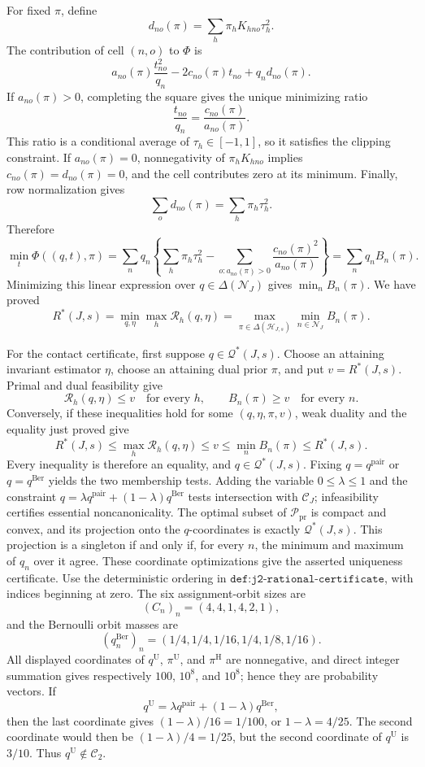 For fixed \(\pi\), define
\[
 d_{no}(\pi)=\sum_h\pi_hK_{hno}\tau_h^2.
\]
The contribution of cell \((n,o)\) to \(\Phi\) is
\[
 a_{no}(\pi)\frac{t_{no}^2}{q_n}-2c_{no}(\pi)t_{no}+q_nd_{no}(\pi).
\]
If \(a_{no}(\pi)>0\), completing the square gives the unique minimizing ratio
\[
 \frac{t_{no}}{q_n}=\frac{c_{no}(\pi)}{a_{no}(\pi)}.
\]
This ratio is a conditional average of \(\tau_h\in[-1,1]\), so it satisfies the clipping constraint. If \(a_{no}(\pi)=0\), nonnegativity of \(\pi_hK_{hno}\) implies \(c_{no}(\pi)=d_{no}(\pi)=0\), and the cell contributes zero at its minimum. Finally, row normalization gives
\[
 \sum_o d_{no}(\pi)=\sum_h\pi_h\tau_h^2.
\]
Therefore
\[
 \min_t\Phi((q,t),\pi)
 =\sum_nq_n\left\{\sum_h\pi_h\tau_h^2-
 \sum_{o:a_{no}(\pi)>0}\frac{c_{no}(\pi)^2}{a_{no}(\pi)}\right\}
 =\sum_nq_nB_n(\pi).
\]
Minimizing this linear expression over \(q\in\Delta(\mathcal N_J)\) gives \(\min_nB_n(\pi)\). We have proved
\[
 R^*(J,s)=\min_{q,\eta}\max_h\mathcal R_h(q,\eta)
 =\max_{\pi\in\Delta(\mathcal H_{J,s})}\min_{n\in\mathcal N_J}B_n(\pi).
\]

For the contact certificate, first suppose \(q\in\mathcal Q^*(J,s)\). Choose an attaining invariant estimator \(\eta\), choose an attaining dual prior \(\pi\), and put \(v=R^*(J,s)\). Primal and dual feasibility give
\[
 \mathcal R_h(q,\eta)\le v\quad\text{for every }h,
 \qquad
 B_n(\pi)\ge v\quad\text{for every }n.
\]
Conversely, if these inequalities hold for some \((q,\eta,\pi,v)\), weak duality and the equality just proved give
\[
 R^*(J,s)\le\max_h\mathcal R_h(q,\eta)\le v
 \le\min_nB_n(\pi)\le R^*(J,s).
\]
Every inequality is therefore an equality, and \(q\in\mathcal Q^*(J,s)\). Fixing \(q=q^{\mathrm{pair}}\) or \(q=q^{\mathrm{Ber}}\) yields the two membership tests. Adding the variable \(0\le\lambda\le1\) and the constraint \(q=\lambda q^{\mathrm{pair}}+(1-\lambda)q^{\mathrm{Ber}}\) tests intersection with \(\mathcal C_J\); infeasibility certifies essential noncanonicality. The optimal subset of \(\mathcal P_{\mathrm{pr}}\) is compact and convex, and its projection onto the \(q\)-coordinates is exactly \(\mathcal Q^*(J,s)\). This projection is a singleton if and only if, for every \(n\), the minimum and maximum of \(q_n\) over it agree. These coordinate optimizations give the asserted uniqueness certificate.
Use the deterministic ordering in \(\texttt{def:j2-rational-certificate}\), with indices beginning at zero. The six assignment-orbit sizes are
\[
 (C_n)_n=(4,4,1,4,2,1),
\]
and the Bernoulli orbit masses are
\[
 (q_n^{\mathrm{Ber}})_n=(1/4,1/4,1/16,1/4,1/8,1/16).
\]
All displayed coordinates of \(q^{\mathrm U}\), \(\pi^{\mathrm U}\), and \(\pi^{\mathrm H}\) are nonnegative, and direct integer summation gives respectively \(100\), \(10^8\), and \(10^8\); hence they are probability vectors. If
\[
 q^{\mathrm U}=\lambda q^{\mathrm{pair}}+(1-\lambda)q^{\mathrm{Ber}},
\]
then the last coordinate gives \((1-\lambda)/16=1/100\), or \(1-\lambda=4/25\). The second coordinate would then be \((1-\lambda)/4=1/25\), but the second coordinate of \(q^{\mathrm U}\) is \(3/10\). Thus \(q^{\mathrm U}\notin\mathcal C_2\).

